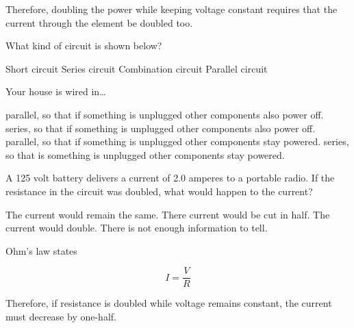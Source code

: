 \documentclass[]{exam}
\begin{document}
\begin{questions}
\begin{solution}
Therefore, doubling the power while keeping voltage constant requires that the current through the element be doubled too.
\end{solution}

\question
What kind of circuit is shown below?

\begin{center}
\end{center}

\begin{randomizeoneparchoices}
    \choice Short circuit
    \choice Series circuit
    \correctchoice Combination circuit
    \choice Parallel circuit
\end{randomizeoneparchoices}

\question
Your house is wired in\ldots 

\begin{randomizechoices}
    \choice parallel, so that if something is unplugged other components also power off.
    \choice series, so that if something is unplugged other components also power off.
    \correctchoice parallel, so that if something is unplugged other components stay powered.
    \choice series, so that is something is unplugged other components stay powered.
\end{randomizechoices}

\question
A 125 volt battery delivers a current of 2.0 amperes to a portable radio. If the resistance in the circuit was doubled, what would happen to the current?

\begin{randomizechoices}[keeplast]
    \choice The current would remain the same.
    \correctchoice There current would be cut in half.
    \choice The current would double.
    \choice There is not enough information to tell.
\end{randomizechoices}

\begin{solution}
Ohm's law states

\begin{equation*}
    I = \frac{V}{R}
\end{equation*}

Therefore, if resistance is doubled while voltage remains constant, the current must decrease by one-half.
\end{solution}


\end{questions}
\end{document}
